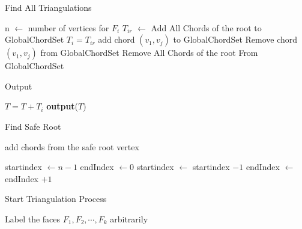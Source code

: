 \documentclass{beamer}
\begin{document}
\begin{frame}{Find All Triangulations}
	\begin{algorithmic}[1]
		\State n $\gets$ number of vertices for $F_i$
		\State $T_{ir}$ $\gets$  
        \State Add All Chords of the root to GlobalChordSet 
		\State {}
		\State $T_i = T_{ir}$
        \State add chord $(v_{1},v_{j})$ to GlobalChordSet
		\State {}
        \State Remove chord $(v_{1},v_{j})$ from GlobalChordSet
		\EndFor
        \State Remove All Chords of the root From GlobalChordSet 
		\EndProcedure
	\end{algorithmic}
\end{frame}

\begin{frame}{Output}
    \begin{algorithmic}[1]
            \State $T = T + T_i$
                \State \textbf{output}($T$)
            \Else 
                \State {}
            \EndIf
        \EndProcedure
    \end{algorithmic}
\end{frame}


\begin{frame}{Find Safe Root}
	\small
	\begin{algorithmic}[1]
		\State {}
		\State add chords from the safe root vertex
		\State \Return
		\EndProcedure
	\end{algorithmic}

	\vspace{0.1cm}
	\begin{algorithmic}[1]
		\State startindex $\gets n - 1$
		\State endIndex $\gets 0$
		\State startindex $\gets$ startindex $- 1$
		\Else
		\State endIndex $\gets$ endIndex $+ 1$
		\EndIf
		\EndWhile
		\EndProcedure
	\end{algorithmic}

\end{frame}



\begin{frame}{Start Triangulation Process}
	\begin{algorithmic}[1]
		\State Label the faces $F_1, F_2, \cdots, F_k$ arbitrarily
		\State {}
		\EndProcedure
	\end{algorithmic}
\end{frame}
\end{document}
